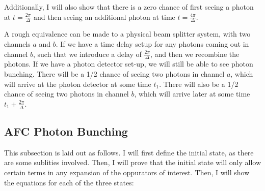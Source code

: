 \documentclass[12pt]{article}
\begin{document}
Additionally, I will also show that there is a zero chance of first seeing a photon at $t = \frac{2 \pi}{\Delta}$ and then seeing an additional photon at time $t = \frac{4 \pi}{\Delta}$.

A rough equivalence can be made to a physical beam splitter system, with two channels $a$ and $b$. If we have a time delay setup for any photons coming out in channel $b$, such that we introduce a delay of $\frac{2 \pi}{\Delta}$, and then
we recombine the photons. If we have a photon detector set-up, we will still be able to see photon bunching. There will be a 1/2 chance of seeing two photons in channel $a$, which will arrive at the photon detector at some time $t_1$. There will also be a 1/2 chance of seeing two photons in channel $b$, which will arrive later at some time $t_1+\frac{2 \pi}{\Delta}$. 
\subsection{AFC Photon Bunching}
This subsection is laid out as follows. I will first define the initial state, as there are some sublities involved. Then, I will prove that the initial state will only allow certain terms in any expansion of the oppurators of interest. Then, I will show the equations for each of the three states:
\end{document}
